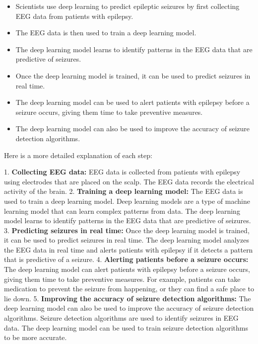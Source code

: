 \documentclass[stu,donotrepeattitle]{apa7}
\begin{document}
\begin{itemize}

    \item Scientists use deep learning to predict epileptic seizures by first collecting EEG data from patients with epilepsy.
    \item The EEG data is then used to train a deep learning model.
    \item The deep learning model learns to identify patterns in the EEG data that are predictive of seizures.
    \item Once the deep learning model is trained, it can be used to predict seizures in real time.
    \item The deep learning model can be used to alert patients with epilepsy before a seizure occurs, giving them time to take preventive measures.
    \item The deep learning model can also be used to improve the accuracy of seizure detection algorithms.
    
    \end{itemize}
    
    Here is a more detailed explanation of each step:
    
    1. \textbf{Collecting EEG data:} EEG data is collected from patients with epilepsy using electrodes that are placed on the scalp. The EEG data records the electrical activity of the brain.
    2. \textbf{Training a deep learning model:} The EEG data is used to train a deep learning model. Deep learning models are a type of machine learning model that can learn complex patterns from data. The deep learning model learns to identify patterns in the EEG data that are predictive of seizures.
    3. \textbf{Predicting seizures in real time:} Once the deep learning model is trained, it can be used to predict seizures in real time. The deep learning model analyzes the EEG data in real time and alerts patients with epilepsy if it detects a pattern that is predictive of a seizure.
    4. \textbf{Alerting patients before a seizure occurs:} The deep learning model can alert patients with epilepsy before a seizure occurs, giving them time to take preventive measures. For example, patients can take medication to prevent the seizure from happening, or they can find a safe place to lie down.
    5. \textbf{Improving the accuracy of seizure detection algorithms:} The deep learning model can also be used to improve the accuracy of seizure detection algorithms. Seizure detection algorithms are used to identify seizures in EEG data. The deep learning model can be used to train seizure detection algorithms to be more accurate.
    
\end{document}
